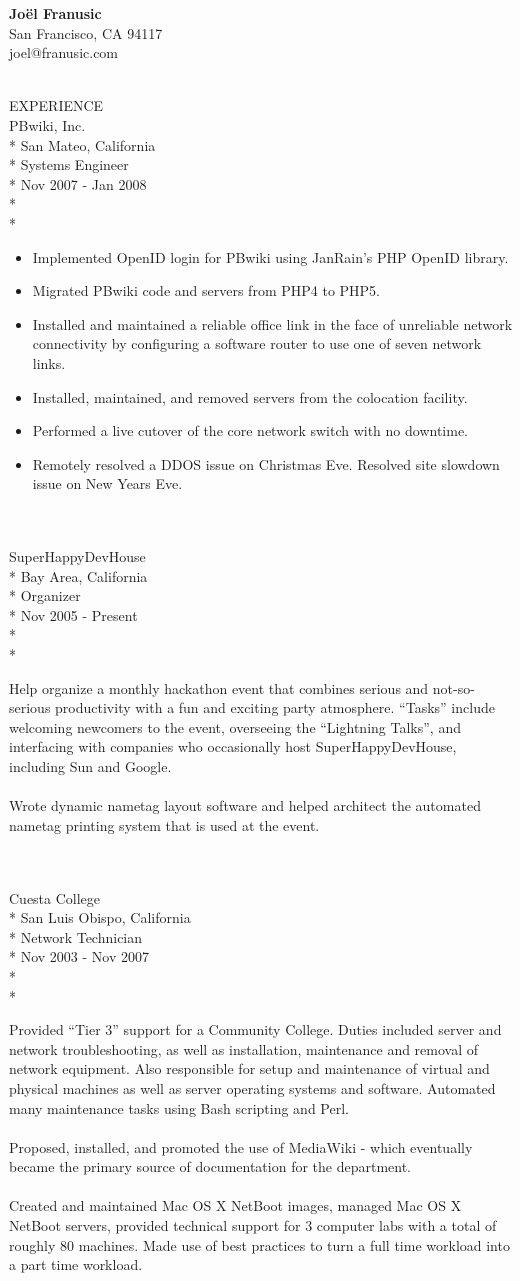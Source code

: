 \documentclass[10pt]{article}
\newcommand{\work}[5]{ 
#1\\*
#3\\*
#4\\*
#2\\*
\\*
\makebox[1.25in][l]{}
\begin{minipage}[t]{5.00in}\small{#5}\end{minipage}
\\
\\
}
\newcommand{\heading}[1]{
#1
\\
}
\newcommand{\address}[1]{
\hfill{}\begin{minipage}[t]{2.00in}#1\end{minipage}
\\
}
\begin{document}
\address{\textbf{Jo\"el Franusic}\\ San Francisco, CA 94117\\ joel@franusic.com}

\heading{EXPERIENCE}

\work{PBwiki, Inc.}{Nov 2007 - Jan 2008}{San Mateo, California}{Systems Engineer}{
    \begin{itemize}
    \item Implemented OpenID login for PBwiki using JanRain's PHP OpenID library.
    \item Migrated PBwiki code and servers from PHP4 to PHP5.
    \item Installed and maintained a reliable office link in the face of unreliable network connectivity by configuring a software router to use one of seven network links.
    \item Installed, maintained, and removed servers from the colocation facility.
    \item Performed a live cutover of the core network switch with no downtime.
    \item Remotely resolved a DDOS issue on Christmas Eve. Resolved site slowdown issue on New Years Eve.
    \end{itemize}
}

\work{SuperHappyDevHouse}{Nov 2005 - Present}{Bay Area, California}{Organizer}{
Help organize a monthly hackathon event that combines serious and not-so-serious productivity with a fun and exciting party atmosphere. ``Tasks'' include welcoming newcomers to the event, overseeing the ``Lightning Talks'', and interfacing with companies who occasionally host SuperHappyDevHouse, including Sun and Google.
\\
\\
Wrote dynamic nametag layout software and helped architect the automated nametag printing system that is used at the event.
}

\work{Cuesta College}{Nov 2003 - Nov 2007}{San Luis Obispo, California}{Network Technician}{
Provided ``Tier 3'' support for a Community College. 
Duties included server and network troubleshooting, 
as well as installation, maintenance and removal of network equipment.
Also responsible for setup and maintenance of virtual and physical machines as well as server operating systems and software.  
Automated many maintenance tasks using Bash scripting and Perl.
\\
\\ 
Proposed, installed, and promoted the use of MediaWiki - which eventually became the primary source of documentation for the department.
\\
\\
Created and maintained Mac OS X NetBoot images, managed Mac OS X NetBoot servers, provided technical support for 3 computer labs with a total of roughly 80 machines. Made use of best practices to turn a full time workload into a part time workload.
}
\end{document}
